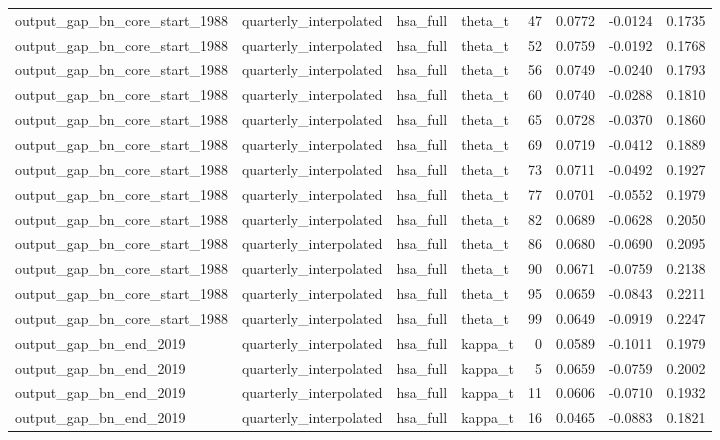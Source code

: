 \begin{tabular}{llllrrrr}
output\_gap\_bn\_core\_start\_1988 & quarterly\_interpolated & hsa\_full & theta\_t & 47 & 0.0772 & -0.0124 & 0.1735 \\
output\_gap\_bn\_core\_start\_1988 & quarterly\_interpolated & hsa\_full & theta\_t & 52 & 0.0759 & -0.0192 & 0.1768 \\
output\_gap\_bn\_core\_start\_1988 & quarterly\_interpolated & hsa\_full & theta\_t & 56 & 0.0749 & -0.0240 & 0.1793 \\
output\_gap\_bn\_core\_start\_1988 & quarterly\_interpolated & hsa\_full & theta\_t & 60 & 0.0740 & -0.0288 & 0.1810 \\
output\_gap\_bn\_core\_start\_1988 & quarterly\_interpolated & hsa\_full & theta\_t & 65 & 0.0728 & -0.0370 & 0.1860 \\
output\_gap\_bn\_core\_start\_1988 & quarterly\_interpolated & hsa\_full & theta\_t & 69 & 0.0719 & -0.0412 & 0.1889 \\
output\_gap\_bn\_core\_start\_1988 & quarterly\_interpolated & hsa\_full & theta\_t & 73 & 0.0711 & -0.0492 & 0.1927 \\
output\_gap\_bn\_core\_start\_1988 & quarterly\_interpolated & hsa\_full & theta\_t & 77 & 0.0701 & -0.0552 & 0.1979 \\
output\_gap\_bn\_core\_start\_1988 & quarterly\_interpolated & hsa\_full & theta\_t & 82 & 0.0689 & -0.0628 & 0.2050 \\
output\_gap\_bn\_core\_start\_1988 & quarterly\_interpolated & hsa\_full & theta\_t & 86 & 0.0680 & -0.0690 & 0.2095 \\
output\_gap\_bn\_core\_start\_1988 & quarterly\_interpolated & hsa\_full & theta\_t & 90 & 0.0671 & -0.0759 & 0.2138 \\
output\_gap\_bn\_core\_start\_1988 & quarterly\_interpolated & hsa\_full & theta\_t & 95 & 0.0659 & -0.0843 & 0.2211 \\
output\_gap\_bn\_core\_start\_1988 & quarterly\_interpolated & hsa\_full & theta\_t & 99 & 0.0649 & -0.0919 & 0.2247 \\
output\_gap\_bn\_end\_2019 & quarterly\_interpolated & hsa\_full & kappa\_t & 0 & 0.0589 & -0.1011 & 0.1979 \\
output\_gap\_bn\_end\_2019 & quarterly\_interpolated & hsa\_full & kappa\_t & 5 & 0.0659 & -0.0759 & 0.2002 \\
output\_gap\_bn\_end\_2019 & quarterly\_interpolated & hsa\_full & kappa\_t & 11 & 0.0606 & -0.0710 & 0.1932 \\
output\_gap\_bn\_end\_2019 & quarterly\_interpolated & hsa\_full & kappa\_t & 16 & 0.0465 & -0.0883 & 0.1821 \\

\end{tabular}
